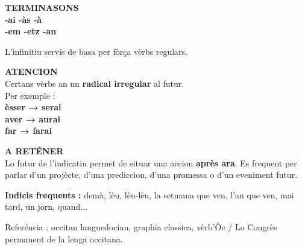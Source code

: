 \documentclass[a4paper,11pt]{article}
\begin{document}
\begin{minipage}{0.91\textwidth}
\vspace{2mm}
\begin{minipage}{0.485\textwidth}
\begin{orangebox}[height=3.25cm]
\textbf{\color{OrangeDark}TERMINASONS}\\[1mm]
\centering
\textbf{-ai \quad -às \quad -à}\\
\textbf{-em \quad -etz \quad -an}\\[1mm]
\raggedright
L'infinitiu servís de basa per fòrça vèrbs regulars.
\end{orangebox}
\end{minipage}\hfill
\begin{minipage}{0.485\textwidth}
\begin{warnbox}[height=3.25cm]
\textbf{\color{Red}ATENCION}\\[1mm]
Certans vèrbs an un \textbf{radical irregular} al futur.\\[1mm]
Per exemple :\\
\textbf{èsser → serai}\\
\textbf{aver → aurai}\\
\textbf{far → farai}
\end{warnbox}
\end{minipage}

\vspace{2mm}
\begin{orangebox}
\textbf{\color{OrangeDark}A RETÉNER}\\[1mm]
Lo futur de l'indicatiu permet de situar una accion \textbf{après ara}. Es frequent per parlar
d'un projècte, d'una prediccion, d'una promessa o d'un eveniment futur.
\end{orangebox}

\vspace{1.5mm}\centering
{\small\color{Grey}\textbf{Indicis frequents :} demà, lèu, lèu-lèu, la setmana que ven, l'an que ven, mai tard, un jorn, quand...}

\vspace{1mm}
{\scriptsize\color{Grey}Referéncia : occitan languedocian, graphia classica, vèrb'Òc / Lo Congrès permanent de la lenga occitana.}

\end{minipage}
\end{document}
